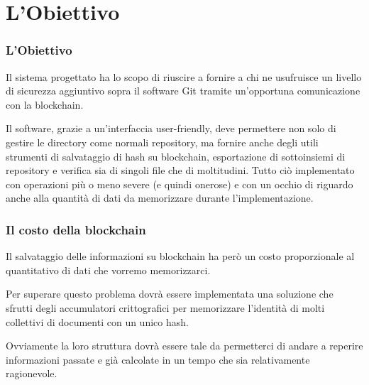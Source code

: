 \documentclass{beamer}
\begin{document}
\section{L'Obiettivo}
\begin{frame}
	\frametitle{L'Obiettivo}
	Il sistema progettato ha lo scopo di riuscire a fornire a chi ne usufruisce
	un livello di sicurezza aggiuntivo sopra il software Git tramite un'opportuna
	comunicazione con la blockchain.

	Il software, grazie a un'interfaccia user-friendly, deve permettere non solo di gestire
	le directory come normali repository, ma fornire
	anche degli utili strumenti di salvataggio di hash su blockchain,
	esportazione di sottoinsiemi di repository
	e verifica sia di singoli file che di moltitudini.
	Tutto ciò implementato con operazioni più o meno severe (e quindi onerose)
	e con un occhio di riguardo anche alla quantità di
	dati da memorizzare durante l'implementazione.
\end{frame}


\begin{frame}
	\frametitle{Il costo della blockchain}
	Il salvataggio delle informazioni su blockchain ha però un costo proporzionale al quantitativo
	di dati che vorremo memorizzarci.
	
	Per superare questo problema dovrà essere implementata una soluzione che sfrutti
	degli accumulatori crittografici per memorizzare l'identità di molti collettivi di documenti
	con un unico hash.

	Ovviamente la loro struttura dovrà essere tale da permetterci di andare a reperire
	informazioni passate e già calcolate in un tempo che sia relativamente ragionevole.
\end{frame}
\end{document}
